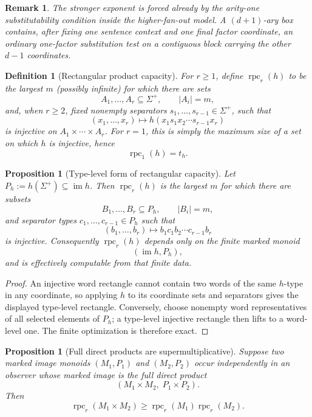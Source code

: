 \documentclass[11pt]{article}
\newtheorem{proposition}[theorem]{Proposition}
\newtheorem{definition}[theorem]{Definition}
\newtheorem{remark}[theorem]{Remark}
\begin{document}
\begin{remark}
The stronger exponent is forced already by the arity-one substitutability
condition inside the higher-fan-out model. A \((d+1)\)-ary box contains, after
fixing one sentence context and one final factor coordinate, an ordinary
one-factor substitution test on a contiguous block carrying the other
\(d-1\) coordinates.
\end{remark}

\begin{definition}[Rectangular product capacity]
\label{def:rpc}
For \(r\ge1\), define \(\operatorname{rpc}_r(h)\) to be the largest \(m\)
(possibly infinite) for which there are sets
\[
 A_1,\ldots,A_r\subseteq\Sigma^+,\qquad |A_i|=m,
\]
and, when \(r\ge2\), fixed nonempty separators
\(s_1,\ldots,s_{r-1}\in\Sigma^+\), such that
\[
 (x_1,\ldots,x_r)\longmapsto
 h(x_1s_1x_2\cdots s_{r-1}x_r)
\]
is injective on \(A_1\times\cdots\times A_r\).
For \(r=1\), this is simply the maximum size of a set on which \(h\) is
injective, hence
\[
 \operatorname{rpc}_1(h)=t_h.
\]
\end{definition}

\begin{proposition}[Type-level form of rectangular capacity]
\label{prop:rpc-type-level}
Let \(P_h:=h(\Sigma^+)\subseteq\operatorname{im}h\). Then
\(\operatorname{rpc}_r(h)\) is the largest \(m\) for which there are subsets
\[
 B_1,\ldots,B_r\subseteq P_h,\qquad |B_i|=m,
\]
and separator types \(c_1,\ldots,c_{r-1}\in P_h\) such that
\[
 (b_1,\ldots,b_r)\longmapsto
 b_1c_1b_2\cdots c_{r-1}b_r
\]
is injective. Consequently \(\operatorname{rpc}_r(h)\) depends only on the
finite marked monoid
\[
 (\operatorname{im}h,P_h),
\]
and is effectively computable from that finite data.
\end{proposition}

\begin{proof}
An injective word rectangle cannot contain two words of the same \(h\)-type
in any coordinate, so applying \(h\) to its coordinate sets and separators
gives the displayed type-level rectangle. Conversely, choose nonempty word
representatives of all selected elements of \(P_h\); a type-level injective
rectangle then lifts to a word-level one. The finite optimization is
therefore exact.
\end{proof}

\begin{proposition}[Full direct products are supermultiplicative]
\label{prop:rpc-product}
Suppose two marked image monoids
\((M_1,P_1)\) and \((M_2,P_2)\) occur independently in an observer whose
marked image is the full direct product
\[
 (M_1\times M_2,\;P_1\times P_2).
\]
Then
\[
 \operatorname{rpc}_r(M_1\times M_2)
 \ge
 \operatorname{rpc}_r(M_1)\operatorname{rpc}_r(M_2).
\]
\end{proposition}
\end{document}
